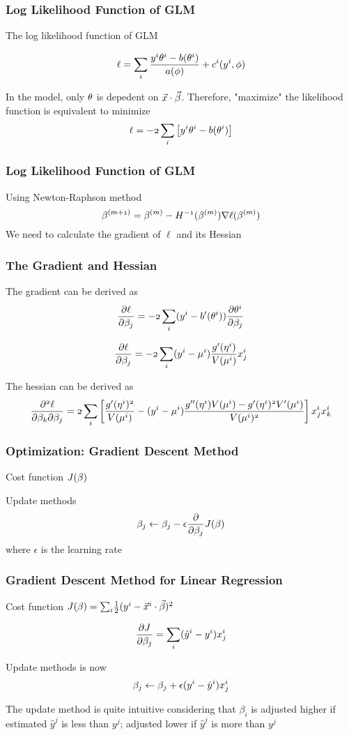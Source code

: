 \documentclass[notheorems, aspectratio=54]{beamer}
\begin{document}
\begin{frame}
\frametitle{Log Likelihood Function of GLM}
The log likelihood function of GLM

$$\mathnormal{\ell}=\mathnormal{\sum_{i}\frac{y^i\theta^i-b(\theta^i)}{a(\phi)}+c^i(y^i, \phi)}$$

In the model, only $\mathnormal{\theta}$ is depedent on $\mathnormal{\vec{x}\cdot\vec{\beta}}$. Therefore, "maximize" the likelihood function is equivalent to minimize  
$$\mathnormal{\ell=-2\sum_{i} \left[y^i\theta^i-b(\theta^i)\right]}$$

\end{frame}

\begin{frame}
\frametitle{Log Likelihood Function of GLM}

Using Newton-Raphson method
$$
\mathnormal{\beta^{(m+1)}}=\mathnormal{\beta^{(m)}-H^{-1}(\beta^{(m)})\nabla \ell(\beta^{(m)})}
$$
We need to calculate the gradient of $\ell$ and its Hessian
\end{frame}

\begin{frame}
\frametitle{The Gradient and Hessian}
The gradient can be derived as
$$\mathnormal{\frac{\partial \ell}{\partial \beta_j}}=\mathnormal{-2\sum_i(y^i-b'(\theta^i))\frac{\partial\theta^i}{\partial\beta_j}}$$

$$\mathnormal{\frac{\partial \ell}{\partial \beta_j}}=\mathnormal{-2\sum_i(y^i-\mu^i)\frac{g'(\eta^i)}{V(\mu^i)}x_j^i}$$

The hessian can be derived as
$$\mathnormal{\frac{\partial^2 \ell}{\partial \beta_k\partial \beta_j}=2\sum_i\left[\frac{g'(\eta^i)^2}{V(\mu^i)}-(y^i-\mu^i)\frac{g''(\eta^i)V(\mu^i)-g'(\eta^i)^2V'(\mu^i)}{V(\mu^i)^2}\right]x_j^ix_k^i}$$
\end{frame}


\begin{frame}

\frametitle{Optimization: Gradient Descent Method}
Cost function $\mathnormal{J(\beta)}$

Update methods
$$\mathnormal{\beta_j\leftarrow \beta_j-\epsilon\frac{\partial}{\partial\beta_j}J(\beta)}$$
where $\epsilon$ is the learning rate
\end{frame}	


\begin{frame}

\frametitle{Gradient Descent Method for Linear Regression}
Cost function $\mathnormal{J(\beta)}=\mathnormal{\sum_i}{\frac{1}{2}(\mathnormal{y}^i-\vec{\mathnormal{x}}^i\cdot\vec{\beta})^2}$

$$\mathnormal{\frac{\partial J}{\partial \beta_j}}={\sum_i(\hat{\mathnormal{y}}^i-\mathnormal{y}^i)\mathnormal{x}_j^i}$$

Update methods is now
$$\beta_j\leftarrow \beta_j+\epsilon(\mathnormal{y}^i-\hat{\mathnormal{y}}^i)\mathnormal{x}_j^i$$

The update method is quite intuitive considering that $\beta_i$ is adjusted higher if estimated $\hat{y}^j$ is less than $y^j$; adjusted lower if $\hat{y}^j$ is more than $y^j$

\end{frame}	
\end{document}
